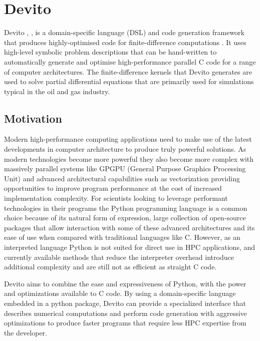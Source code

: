 \documentclass[a4paper,12pt,twoside]{report}
\begin{document}
\chapter{Devito}
Devito \cite{devito-fd}, \cite{devito-dsl}, is a domain-specific language (DSL) and code generation framework that produces highly-optimised
code for finite-difference computations \cite{opesci-fd}. It uses high-level symbolic problem descriptions that can be hand-written to automatically
generate and optimise high-performance parallel C code for a range of computer architectures. The finite-difference kernels that
Devito generates are used to solve partial differential equations that are primarily used for simulations typical in the oil and gas industry.

\section{Motivation}
Modern high-performance computing applications need to make use of the latest developments in computer architecture to produce truly
powerful solutions. As modern technologies become more powerful they also become more complex with massively parallel systems like
GPGPU (General Purpose Graphics Processing Unit) and advanced architectural capabilities such as vectorization providing opportunities
to improve program performance at the cost of increased implementation complexity. For scientists looking to leverage performant
technologies in their programs the Python programming language is a common choice because of its natural form of expression,
large collection of open-source packages that allow interaction with some of these advanced architectures and its ease of use when compared with traditional languages like C.
However, as an interpreted language Python is not suited for direct use in HPC applications, and currently available methods that reduce the interpreter overhead introduce
additional complexity and are still not as efficient as straight C code. 

Devito aims to combine the ease and expressiveness of Python, with the 
power and optimizations available to C code. By using a domain-specific language embedded in a python package, Devito can provide a specialized interface
that describes numerical computations and perform code generation with aggressive optimizations to produce faster programs that require less HPC expertise
from the developer.
\end{document}
